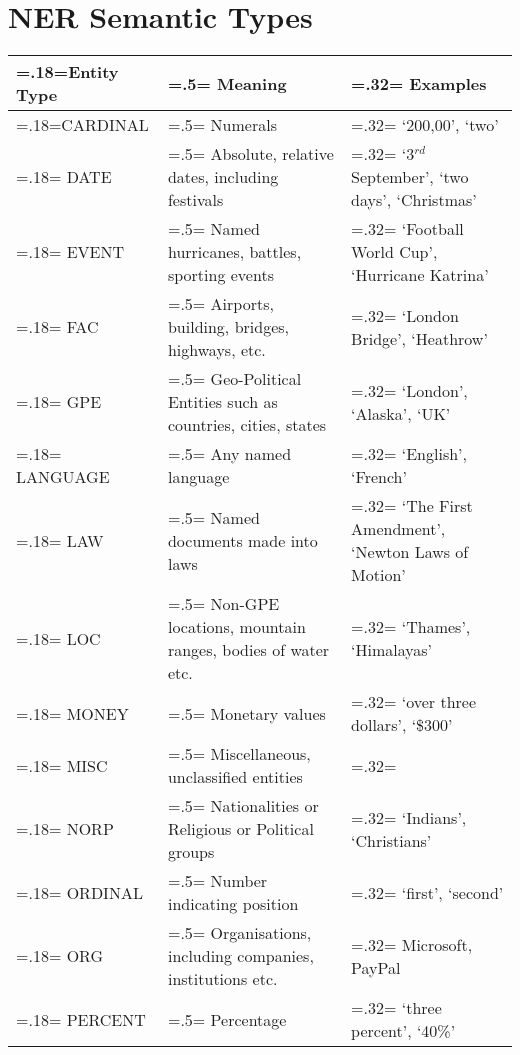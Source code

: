 \chapter{\vspace{-3px}NER Semantic Types}

\vspace{-1em}
\begin{table}[H]
    \centering
    \renewcommand{\arraystretch}{1.1}
    \begin{tabularx}{\textwidth}{|>{\hsize=.18\hsize\linewidth=\hsize}X|>{\hsize=.5\hsize\linewidth=\hsize}X|>{\hsize=.32\hsize\linewidth=\hsize}X|} 
     \hline
      \textbf{Entity Type} & \textbf{Meaning} & \textbf{Examples}\\
     \hline
        CARDINAL & Numerals  & `200,00', `two'\\
        \hline
        DATE &  Absolute, relative dates, including festivals & `3$^{rd}$ September', `two days', `Christmas'\\
        \hline
        EVENT &  Named hurricanes, battles, sporting events & `Football World Cup', `Hurricane Katrina'
        \\
        \hline
        FAC &  Airports, building, bridges, highways, etc. & `London Bridge', `Heathrow'\\
        \hline
        GPE &  Geo-Political Entities such as countries, cities, states & `London', `Alaska', `UK'\\
        \hline
        LANGUAGE & Any named language & `English', `French' \\
        \hline
        LAW & Named documents made into laws & `The First Amendment', `Newton Laws of Motion'\\
        \hline
        LOC & Non-GPE locations, mountain ranges, bodies of water etc. & `Thames', `Himalayas' \\
        \hline
        MONEY & Monetary values & `over three dollars', `\$300'\\
        \hline
        MISC & Miscellaneous, unclassified entities & \\
        \hline
        NORP & Nationalities or Religious or Political groups & `Indians', `Christians'\\
        \hline
        ORDINAL & Number indicating position & `first', `second' \\
        \hline
        ORG &  Organisations, including companies, institutions etc. & Microsoft, PayPal \\
        \hline
        PERCENT & Percentage & `three percent', `40\%'\\

\end{tabularx}
\end{table}
